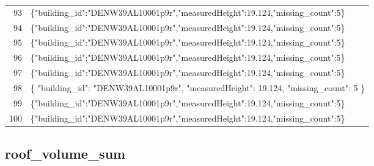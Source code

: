 \documentclass[a4paper,11pt]{article}
\begin{document}
\begin{table}[ht]
\begin{tabular}{r p{12cm}}
93 & \{"building\_id":"DENW39AL10001p9r","measuredHeight":19.124,"missing\_count":5\} \\
94 & \{"building\_id":"DENW39AL10001p9r","measuredHeight":19.124,"missing\_count":5\} \\
95 & \{"building\_id":"DENW39AL10001p9r","measuredHeight":19.124,"missing\_count":5\} \\
96 & \{"building\_id":"DENW39AL10001p9r","measuredHeight":19.124,"missing\_count":5\} \\
97 & \{"building\_id":"DENW39AL10001p9r","measuredHeight":19.124,"missing\_count":5\} \\
98 & \{
  "building\_id": "DENW39AL10001p9r",
  "measuredHeight": 19.124,
  "missing\_count": 5
\} \\
99 & \{"building\_id":"DENW39AL10001p9r","measuredHeight":19.124,"missing\_count":5\} \\
100 & \{"building\_id":"DENW39AL10001p9r","measuredHeight":19.124,"missing\_count":5\} \\
\hline
\end{tabular}
\end{table}

\clearpage
\subsection{roof\_volume\_sum}
\end{document}
